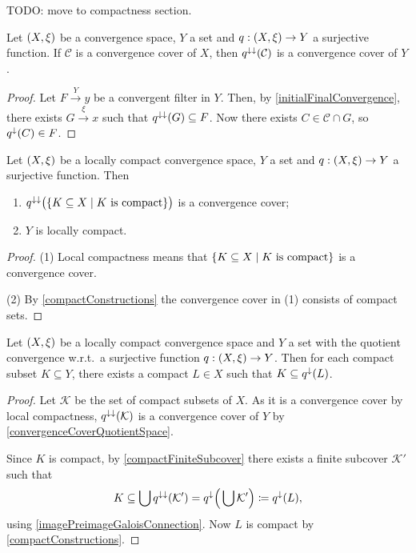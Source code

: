 TODO: move to compactness section.
\begin{lemma} \label{convergenceCoverQuotientSpace}
Let $\sSet{X,\xi}$ be a convergence space, $Y$ a set and $q: \sSet{X,\xi}\to Y$ a surjective function. If $\mathcal{C}$ is a convergence cover of $X$, then $q^{\downarrow\downarrow}(\mathcal{C})$ is a convergence cover of $Y$.
\end{lemma}
\begin{proof}
Let $F\overset{Y}{\longrightarrow} y$ be a convergent filter in $Y$. Then, by \ref{initialFinalConvergence}, there exists $G\overset{\xi}{\longrightarrow} x$ such that $q^{\downarrow\downarrow}(G)\subseteq F$. Now there exists $C\in \mathcal{C}\cap G$, so $q^{\downarrow}(C)\in F$.
\end{proof}
\begin{corollary} \label{quotientConvergenceCompactConvergenceCover}
Let $\sSet{X,\xi}$ be a locally compact convergence space, $Y$ a set and $q: \sSet{X,\xi}\to Y$ a surjective function. Then
\begin{enumerate}
\item $q^{\imf\imf}\big(\setbuilder{K\subseteq X}{\text{$K$ is compact}}\big)$ is a convergence cover;
\item $Y$ is locally compact.
\end{enumerate}
\end{corollary}
\begin{proof}
(1) Local compactness means that $\setbuilder{K\subseteq X}{\text{$K$ is compact}}$ is a convergence cover.

(2) By \ref{compactConstructions} the convergence cover in (1) consists of compact sets.
\end{proof}

\begin{lemma} \label{preimageCompactnessQuotientConvergence}
Let $\sSet{X,\xi}$ be a locally compact convergence space and $Y$ a set with the quotient convergence w.r.t.\ a surjective function $q: \sSet{X,\xi}\to Y$. 
Then for each compact subset $K\subseteq Y$, there exists a compact $L\in X$ such that $K \subseteq q^\downarrow(L)$. 
\end{lemma}
\begin{proof}
Let $\mathcal{K}$ be the set of compact subsets of $X$. As it is a convergence cover by local compactness, $q^{\downarrow\downarrow}(\mathcal{K})$ is a convergence cover of $Y$ by \ref{convergenceCoverQuotientSpace}.

Since $K$ is compact, by \ref{compactFiniteSubcover} there exists a finite subcover $\mathcal{K}'$ such that
\[ K\subseteq \bigcup q^{\downarrow\downarrow}(\mathcal{K}') = q^{\downarrow}\Big(\bigcup\mathcal{K}'\Big) \coloneqq q^\downarrow(L), \]
using \ref{imagePreimageGaloisConnection}. Now $L$ is compact by \ref{compactConstructions}.
\end{proof}


